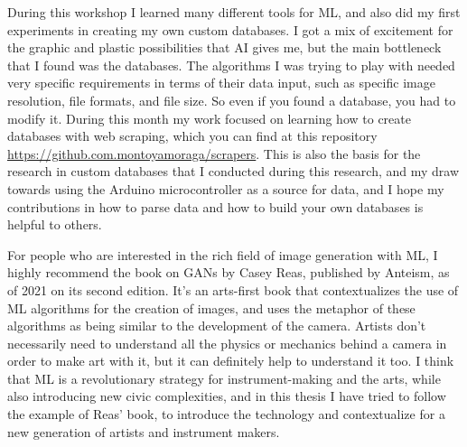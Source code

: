 During this workshop I learned many different tools for \acrshort{ML}, and also did my first experiments in creating my own custom databases. I got a mix of excitement for the graphic and plastic possibilities that \acrshort{AI} gives me, but the main bottleneck that I found was the databases. The algorithms I was trying to play with needed very specific requirements in terms of their data input, such as specific image resolution, file formats,  and file size. So even if you found a database, you had to modify it. During this month my work focused on learning how to create databases with web scraping, which you can find at this repository \url{https://github.com.montoyamoraga/scrapers}. This is also the basis for the research in custom databases that I conducted during this research, and my draw towards using the Arduino microcontroller as a source for data, and I hope my contributions in how to parse data and how to build your own databases is helpful to others.

For people who are interested in the rich field of image generation with \acrshort{ML}, I highly recommend the book on GANs by Casey Reas, published by Anteism, as of 2021 on its second edition. It’s an arts-first book that contextualizes the use of \acrshort{ML} algorithms for the creation of images, and uses the metaphor of these algorithms as being similar to the development of the camera. Artists don’t necessarily need to understand all the physics or mechanics behind a camera in order to make art with it, but it can definitely help to understand it too. I think that \acrshort{ML} is a revolutionary strategy for instrument-making and the arts, while also introducing new civic complexities, and in this thesis I have tried to follow the example of Reas' book, to introduce the technology and contextualize for a new generation of artists and instrument makers.
